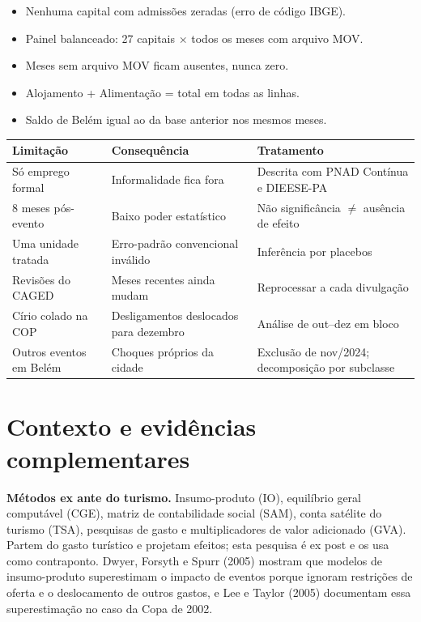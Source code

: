\begin{itemize}[label=$\square$]
  \item Nenhuma capital com admissões zeradas (erro de código IBGE).
  \item Painel balanceado: 27 capitais $\times$ todos os meses com arquivo MOV.
  \item Meses sem arquivo MOV ficam ausentes, nunca zero.
  \item Alojamento + Alimentação = total em todas as linhas.
  \item Saldo de Belém igual ao da base anterior nos mesmos meses.
\end{itemize}

\begin{table}[H]
\centering\small
\begin{tabularx}{\linewidth}{p{3.2cm}LL}
\toprule
\textbf{Limitação} & \textbf{Consequência} & \textbf{Tratamento}\\
\midrule
Só emprego formal & Informalidade fica fora & Descrita com PNAD Contínua e DIEESE-PA\\
8 meses pós-evento & Baixo poder estatístico & Não significância $\neq$ ausência de efeito\\
Uma unidade tratada & Erro-padrão convencional inválido & Inferência por placebos\\
Revisões do CAGED & Meses recentes ainda mudam & Reprocessar a cada divulgação\\
Círio colado na COP & Desligamentos deslocados para dezembro & Análise de out--dez em bloco\\
Outros eventos em Belém & Choques próprios da cidade & Exclusão de nov/2024; decomposição por subclasse\\
\bottomrule
\end{tabularx}
\end{table}


\section{Contexto e evidências complementares}

\textbf{Métodos ex ante do turismo.} Insumo-produto (IO), equilíbrio geral computável (CGE), matriz de
contabilidade social (SAM), conta satélite do turismo (TSA), pesquisas de gasto e multiplicadores de
valor adicionado (GVA). Partem do gasto turístico e projetam efeitos; esta pesquisa é ex post e os usa
como contraponto. Dwyer, Forsyth e Spurr (2005) mostram que modelos de insumo-produto superestimam o
impacto de eventos porque ignoram restrições de oferta e o deslocamento de outros gastos, e Lee e Taylor
(2005) documentam essa superestimação no caso da Copa de 2002.

